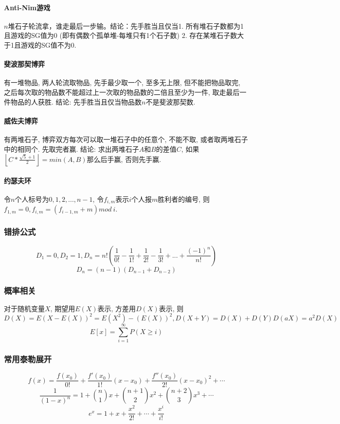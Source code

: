 \begin{small}
\begin{multicols}{2}
\paragraph{Anti-Nim游戏}$n$堆石子轮流拿，谁走最后一步输。结论：先手胜当且仅当1. 所有堆石子数都为1且游戏的SG值为0 (即有偶数个孤单堆-每堆只有1个石子数) 2. 存在某堆石子数大于1且游戏的SG值不为0.
\paragraph{斐波那契博弈}有一堆物品, 两人轮流取物品, 先手最少取一个, 至多无上限, 但不能把物品取完, 之后每次取的物品数不能超过上一次取的物品数的二倍且至少为一件, 取走最后一件物品的人获胜. 结论: 先手胜当且仅当物品数$n$不是斐波那契数. 
\paragraph{威佐夫博弈}有两堆石子, 博弈双方每次可以取一堆石子中的任意个, 不能不取, 或者取两堆石子中的相同个. 先取完者赢. 结论: 求出两堆石子$A$和$B$的差值$C$, 如果$\left\lfloor C*\frac{\sqrt{5}+1}{2}\right\rfloor=min(A,B)$那么后手赢, 否则先手赢. 
\paragraph{约瑟夫环}令$n$个人标号为$0,1,2,...,n-1$, 令$f_{i,m}$表示$i$个人报$m$胜利者的编号, 则$f_{1,m}=0,f_{i,m}=(f_{i-1,m}+m)mod\ i$. 
\end{multicols}

\subsubsection{错排公式}
\[D_1=0,D_2=1,D_n=n!(\frac{1}{0!}-\frac{1}{1!}+\frac{1}{2!}-\frac{1}{3!}+...+\frac{(-1)^n}{n!})\]
\[D_n=(n-1)(D_{n-1}+D_{n-2})\]
\subsubsection{概率相关}
对于随机变量$X$, 期望用$E(X)$表示, 方差用$D(X)$表示, 则$D(X)=E(X-E(X))^2=E(X^2)-(E(X))^2,D(X+Y)=D(X)+D(Y)D(aX)=a^2D(X)$\\
\[E[x]=\sum_{i=1}^{\infty}P(X\geq i)\]
\subsubsection{常用泰勒展开}
\[f(x)=\frac{f(x_0)}{0!}+\frac{f'(x_0)}{1!}(x-x_0)+\frac{f''(x_0)}{2!}(x-x_0)^2+\cdots\]
\[\frac{1}{(1-x)^n}=1+\binom{n}{1}x+\binom{n+1}{2}x^2+\binom{n+2}{3}x^3+\cdots \]
\[e^x=1+x+\frac{x^2}{2!}+\cdots+\frac{x^i}{i!}\]


\end{small}
